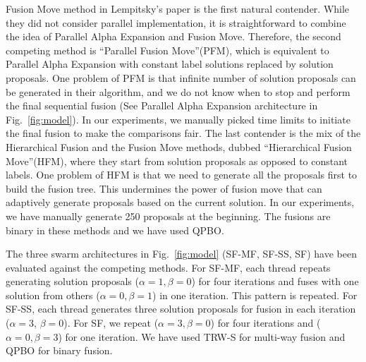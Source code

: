 \noindent Fusion Move method in Lempitsky's paper is the first natural
contender. While they did not consider parallel implementation, it is
straightforward to combine the idea of Parallel Alpha Expansion and
Fusion Move. Therefore, the second competing method is ``Parallel Fusion
Move''(PFM), which is equivalent to Parallel Alpha Expansion with constant
label solutions replaced by solution proposals.
%
One problem of PFM is that infinite number of solution proposals can be
generated in their algorithm, and we do not know when to stop and
perform the final sequential fusion (See Parallel Alpha Expansion
architecture in Fig.~\ref{fig:model}). In our experiments, we manually
picked time limits to initiate the final fusion to make the comparisons
fair.
%
The last contender is the mix of the Hierarchical Fusion and the Fusion
Move methods, dubbed ``Hierarchical Fusion Move''(HFM), where they
start from solution proposals as opposed to constant labels. One problem
of HFM is that we need to generate all the proposals first to build the
fusion tree. This undermines the power of fusion move that can
adaptively generate proposals based on the current solution. In our
experiments, we have manually generate 250 proposals at the
beginning.
The fusions are binary in these methods and we have used QPBO.


\noindent
The three swarm architectures in Fig.~\ref{fig:model} (SF-MF, SF-SS, SF)
have been evaluated against the competing methods. For SF-MF, each
thread repeats generating solution proposals ($\alpha=1, \beta=0$) for four
iterations and fuses with one solution from others ($\alpha=0, \beta=1$)
in one iteration. This pattern is repeated. For SF-SS, each thread
generates three solution proposals for fusion in each iteration
($\alpha=3$, $\beta=0$). For SF, we repeat ($\alpha=3, \beta=0$) for four
iterations and ($\alpha=0, \beta=3$) for one iteration.
We have used TRW-S for multi-way fusion and QPBO for binary fusion.
%
%
